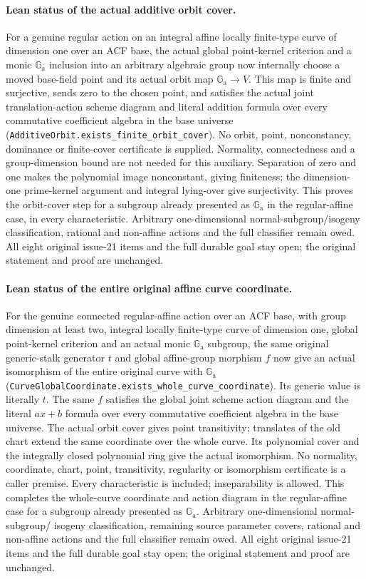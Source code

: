 \documentclass[11pt,oneside]{article}
\theoremstyle{definition}
\theoremstyle{remark}
\newcommand{\Ga}{\mathbb G_{\mathrm a}}
\newcommand{\lean}[1]{\nolinkurl{#1}}
\begin{document}
\paragraph{Lean status of the actual additive orbit cover.}
For a genuine regular action on an integral affine locally finite-type curve of dimension
one over an ACF base, the actual global point-kernel criterion and a monic $\Ga$ inclusion
into an arbitrary algebraic group now internally choose a moved base-field point and its
actual orbit map $\Ga\to V$. This map is finite and surjective, sends zero to the chosen
point, and satisfies the actual joint translation-action scheme diagram and literal
addition formula over every commutative coefficient algebra in the base universe
(\lean{AdditiveOrbit.exists_finite_orbit_cover}). No orbit, point, nonconstancy, dominance
or finite-cover certificate is supplied. Normality, connectedness and a group-dimension
bound are not needed for this auxiliary. Separation of zero and one makes the polynomial
image nonconstant, giving finiteness; the dimension-one prime-kernel argument and integral
lying-over give surjectivity. This proves the orbit-cover step for a subgroup already
presented as $\Ga$ in the regular-affine case, in every characteristic. Arbitrary
one-dimensional normal-subgroup/isogeny classification, rational and non-affine actions
and the full classifier remain owed. All eight original issue-21 items and the full
durable goal stay open; the original statement and proof are unchanged.

\paragraph{Lean status of the entire original affine curve coordinate.}
For the genuine connected regular-affine action over an ACF base, with group dimension at
least two, integral locally finite-type curve of dimension one, global point-kernel criterion
and an actual monic $\Ga$ subgroup, the same original generic-stalk generator $t$ and global
affine-group morphism $f$ now give an actual isomorphism of the entire original curve with
$\Ga$ (\lean{CurveGlobalCoordinate.exists_whole_curve_coordinate}). Its generic value is
literally $t$. The same $f$ satisfies the global joint scheme action diagram and the literal
$ax+b$ formula over every commutative coefficient algebra in the base universe. The actual
orbit cover gives point transitivity; translates of the old chart extend the same coordinate
over the whole curve. Its polynomial cover and the integrally closed polynomial ring give
the actual isomorphism. No normality, coordinate, chart, point, transitivity, regularity or
isomorphism certificate is a caller premise. Every characteristic is included; inseparability
is allowed. This completes the whole-curve coordinate and action diagram in the regular-affine
case for a subgroup already presented as $\Ga$. Arbitrary one-dimensional normal-subgroup/
isogeny classification, remaining source parameter covers, rational and non-affine actions
and the full classifier remain owed. All eight original issue-21 items and the full durable
goal stay open; the original statement and proof are unchanged.
\end{document}
